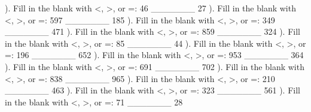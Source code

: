 \documentclass{article}%
\begin{document}
). Fill in the blank with <, >, or =: 46 \_\_\_\_\_\_\_ 27%
\newline%
\newline%
). Fill in the blank with <, >, or =: 597 \_\_\_\_\_\_\_ 185%
\newline%
\newline%
). Fill in the blank with <, >, or =: 349 \_\_\_\_\_\_\_ 471%
\newline%
\newline%
). Fill in the blank with <, >, or =: 859 \_\_\_\_\_\_\_ 324%
\newline%
\newline%
). Fill in the blank with <, >, or =: 85 \_\_\_\_\_\_\_ 44%
\newline%
\newline%
). Fill in the blank with <, >, or =: 196 \_\_\_\_\_\_\_ 652%
\newline%
\newline%
). Fill in the blank with <, >, or =: 953 \_\_\_\_\_\_\_ 364%
\newline%
\newline%
). Fill in the blank with <, >, or =: 691 \_\_\_\_\_\_\_ 702%
\newline%
\newline%
). Fill in the blank with <, >, or =: 838 \_\_\_\_\_\_\_ 965%
\newline%
\newline%
). Fill in the blank with <, >, or =: 210 \_\_\_\_\_\_\_ 463%
\newline%
\newline%
). Fill in the blank with <, >, or =: 323 \_\_\_\_\_\_\_ 561%
\newline%
\newline%
). Fill in the blank with <, >, or =: 71 \_\_\_\_\_\_\_ 28%
\newline%
\newline%
\newline%
\end{document}
